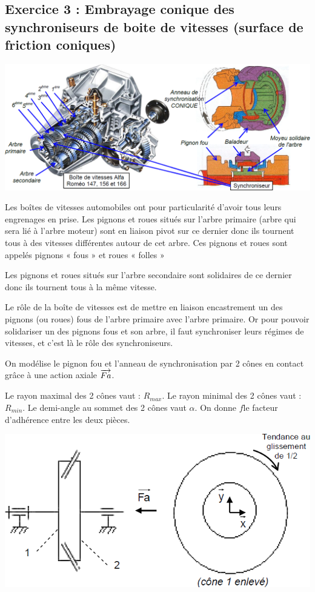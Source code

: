 \documentclass[10pt]{article}
\begin{document}
\subsection*{Exercice 3 : Embrayage conique des synchroniseurs de boite de vitesses (surface de friction coniques)} 
\setcounter{subparagraph}{0}
\begin{center}
\includegraphics[width=.9\textwidth]{images/fig_08}
\end{center}

Les boîtes de vitesses automobiles ont pour particularité d'avoir tous leurs engrenages en prise. 
Les pignons et roues situés sur l’arbre primaire (arbre qui sera lié à l'arbre moteur) sont en liaison pivot sur ce dernier donc ils tournent tous à des vitesses différentes autour de cet arbre. Ces pignons et roues sont 
appelés pignons « fous » et roues « folles » 

Les pignons et roues situés sur l’arbre secondaire sont solidaires de ce dernier donc ils tournent tous à la même vitesse. 

Le rôle de la boîte de vitesses est de mettre en liaison encastrement un des pignons (ou roues) fous de l’arbre primaire avec l’arbre primaire. Or pour pouvoir solidariser un des pignons fous et son arbre, il faut synchroniser leurs régimes de vitesses, et c'est là le rôle des synchroniseurs. 

\begin{minipage}[c]{.55\linewidth}
On modélise le pignon fou et l'anneau de synchronisation par 2 cônes en contact 
grâce à une action axiale $\overrightarrow{Fa}$. 
 
Le rayon maximal des 2 cônes vaut : $R_{max}$. 
Le rayon minimal des 2 cônes vaut : $R_{min}$. 
Le demi-angle au sommet des 2 cônes vaut $\alpha$. 
On donne $f$le facteur d’adhérence 
entre les deux pièces.


\end{minipage}\hfill
\begin{minipage}[c]{.4\linewidth}
\begin{center}
\includegraphics[width=.9\textwidth]{images/fig_09}
\end{center}
\end{minipage}
\end{document}
